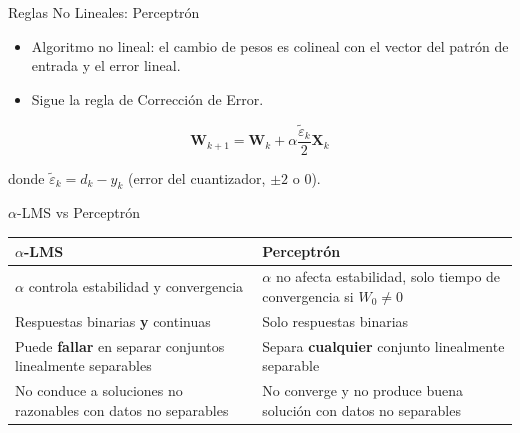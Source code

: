 \documentclass[aspectratio=169,utf8,spanish]{beamer}
\begin{document}
\begin{frame}{Reglas No Lineales: Perceptrón}
  \begin{itemize}
    \item Algoritmo no lineal: el cambio de pesos es colineal con el vector del patrón de entrada y el error lineal.
    \item Sigue la regla de Corrección de Error.
  \end{itemize}

  \begin{equation*}
    \mathbf{W}_{k+1} = \mathbf{W}_k + \alpha \frac{\tilde{\varepsilon}_k}{2} \mathbf{X}_k
  \end{equation*}

  donde $\tilde{\varepsilon}_k = d_k - y_k$ (error del cuantizador, $\pm 2$ o $0$).
\end{frame}

\begin{frame}{$\alpha$-LMS vs Perceptrón}
  \begin{center}
    \begin{tabular}{p{}|p{}}
      \textbf{$\alpha$-LMS} & \textbf{Perceptrón} \\
      \hline
      $\alpha$ controla estabilidad y convergencia & $\alpha$ no afecta estabilidad, solo tiempo de convergencia si $W_0 \neq 0$ \\
      Respuestas binarias \textbf{y} continuas & Solo respuestas binarias \\
      Puede \textbf{fallar} en separar conjuntos linealmente separables & Separa \textbf{cualquier} conjunto linealmente separable \\
      No conduce a soluciones no razonables con datos no separables & No converge y no produce buena solución con datos no separables \\
    \end{tabular}
  \end{center}
\end{frame}
\end{document}
